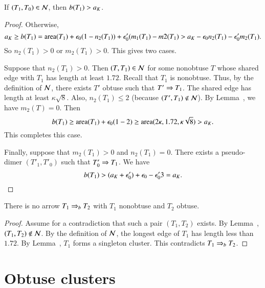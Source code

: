 \begin{lemma}  If $(T_1,T_0)\in \mathcal N$, then $b(T_1)>a_K$.
\end{lemma}

\begin{proof}  Otherwise,
\[
a_K \ge b(T_1) = {\operatorname{area}}(T_1) + \epsilon_0 (1 - n_2(T_1)) + \epsilon_0' (m_1(T_1)-m2(T_1) > a_K - \epsilon_0 n_2(T_1) - \epsilon_0' m_2(T_1).
\]
So $n_2(T_1) > 0$ or $m_2(T_1)>0$. This gives two cases.  

Suppose that $n_2(T_1) >0$.  Then $(T,T_1)\in\mathcal N$ for some nonobtuse $T$ whose shared edge with $T_1$ has length at least $1.72$.
Recall that $T_1$ is nonobtuse.  Thus, by the definition of $\mathcal N$, there exists $T'$ obtuse such that $T'\Rightarrow T_1$.  The shared edge
has length at least $\kappa\sqrt8$.  Also, $n_2(T_1)\le 2$ (because $(T',T_1)\not\in \mathcal N$).  By Lemma~, we have
$m_2(T)=0$.  Then
\[
b(T_1) \ge {\operatorname{area}}(T_1) + \epsilon_0 (1 - 2) \ge {\operatorname{area}} (2\kappa,1.72,\kappa\sqrt8) > a_K.
\]
This completes this case.

Finally, suppose that $m_2(T_1)>0$ and $n_2(T_1)=0$.  There exists a pseudo-dimer $(T'_1,T'_0)$ such that $T'_0\Rightarrow T_1$.
We have
\[
b(T_1) > (a_K + \epsilon_0') + \epsilon_0 -\epsilon_0'  3 = a_K.
\]
\end{proof}



\begin{lemma} 
  There is no arrow $T_1 \Rightarrow_{b} T_2$ with $T_1$ nonobtuse and $T_2$
  obtuse.
\end{lemma}

\begin{proof}  
  Assume for a contradiction that such a pair $(T_1,T_2)$ exists.
By Lemma~, $(T_1,T_2)\not\in\mathcal N$.
By the definition of $\mathcal N$, the longest edge of $T_1$ has length
less than $1.72$.  By Lemma~, $T_1$ forms
a singleton cluster.  This contradicts $T_1\Rightarrow_{b} T_2$.
\end{proof}


\section{Obtuse clusters}


